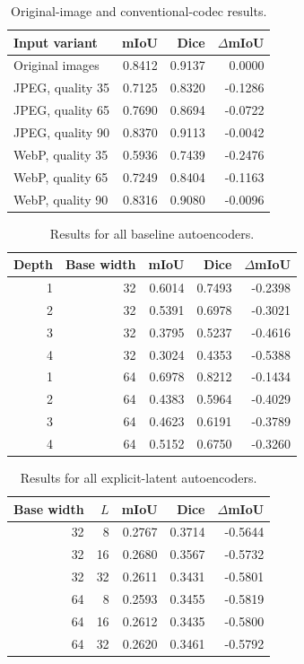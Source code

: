 \documentclass[10pt,a4paper]{article}
\begin{document}
\begin{table}[ht]
\centering
\small
\caption{Original-image and conventional-codec results.}
\begin{tabular}{lrrr}
\toprule
Input variant & mIoU & Dice & \(\Delta\)mIoU \\
\midrule
Original images & 0.8412 & 0.9137 & 0.0000 \\
JPEG, quality 35 & 0.7125 & 0.8320 & -0.1286 \\
JPEG, quality 65 & 0.7690 & 0.8694 & -0.0722 \\
JPEG, quality 90 & 0.8370 & 0.9113 & -0.0042 \\
WebP, quality 35 & 0.5936 & 0.7439 & -0.2476 \\
WebP, quality 65 & 0.7249 & 0.8404 & -0.1163 \\
WebP, quality 90 & 0.8316 & 0.9080 & -0.0096 \\
\bottomrule
\end{tabular}
\label{tab:classic-results}
\end{table}

\begin{table}[ht]
\centering
\small
\caption{Results for all baseline autoencoders.}
\begin{tabular}{rrrrr}
\toprule
Depth & Base width & mIoU & Dice & \(\Delta\)mIoU \\
\midrule
1 & 32 & 0.6014 & 0.7493 & -0.2398 \\
2 & 32 & 0.5391 & 0.6978 & -0.3021 \\
3 & 32 & 0.3795 & 0.5237 & -0.4616 \\
4 & 32 & 0.3024 & 0.4353 & -0.5388 \\
1 & 64 & 0.6978 & 0.8212 & -0.1434 \\
2 & 64 & 0.4383 & 0.5964 & -0.4029 \\
3 & 64 & 0.4623 & 0.6191 & -0.3789 \\
4 & 64 & 0.5152 & 0.6750 & -0.3260 \\
\bottomrule
\end{tabular}
\label{tab:legacy-results}
\end{table}

\begin{table}[ht]
\centering
\small
\caption{Results for all explicit-latent autoencoders.}
\begin{tabular}{rrrrr}
\toprule
Base width & \(L\) & mIoU & Dice & \(\Delta\)mIoU \\
\midrule
32 & 8  & 0.2767 & 0.3714 & -0.5644 \\
32 & 16 & 0.2680 & 0.3567 & -0.5732 \\
32 & 32 & 0.2611 & 0.3431 & -0.5801 \\
64 & 8  & 0.2593 & 0.3455 & -0.5819 \\
64 & 16 & 0.2612 & 0.3435 & -0.5800 \\
64 & 32 & 0.2620 & 0.3461 & -0.5792 \\
\bottomrule
\end{tabular}
\label{tab:latent-results}
\end{table}
\end{document}
